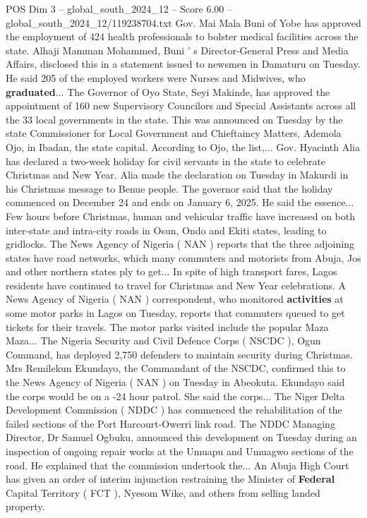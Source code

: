 \begin{textsample}{POS Dim 3 – global\_south\_2024\_12 – Score 6.00 – global\_south\_2024\_12/119238704.txt}
Gov.
Mai Mala Buni of Yobe has approved the employment of 424 health professionals to bolster medical facilities across the state.
Alhaji Mamman Mohammed, Buni ' s Director-General Press and Media Affairs, disclosed this in a statement issued to newsmen in Damaturu on Tuesday.
He said 205 of the employed workers were Nurses and Midwives, who \textbf{graduated}...
The Governor of Oyo State, Seyi Makinde, has approved the appointment of 160 new Supervisory Councilors and Special Assistants across all the 33 local governments in the state.
This was announced on Tuesday by the state Commissioner for Local Government and Chieftaincy Matters, Ademola Ojo, in Ibadan, the state capital.
According to Ojo, the list,...
Gov.
Hyacinth Alia has declared a two-week holiday for civil servants in the state to celebrate Christmas and New Year.
Alia made the declaration on Tuesday in Makurdi in his Christmas message to Benue people.
The governor said that the holiday commenced on December 24 and ends on January 6, 2025.
He said the essence...
Few hours before Christmas, human and vehicular traffic have increased on both inter-state and intra-city roads in Osun, Ondo and Ekiti states, leading to gridlocks.
The News Agency of Nigeria ( NAN ) reports that the three adjoining states have road networks, which many commuters and motorists from Abuja, Jos and other northern states ply to get...
In spite of high transport fares, Lagos residents have continued to travel for Christmas and New Year celebrations.
A News Agency of Nigeria ( NAN ) correspondent, who monitored \textbf{activities} at some motor parks in Lagos on Tuesday, reports that commuters queued to get tickets for their travels.
The motor parks visited include the popular Maza Maza...
The Nigeria Security and Civil Defence Corps ( NSCDC ), Ogun Command, has deployed 2,750 defenders to maintain security during Christmas.
Mrs Remilekun Ekundayo, the Commandant of the NSCDC, confirmed this to the News Agency of Nigeria ( NAN ) on Tuesday in Abeokuta.
Ekundayo said the corps would be on a -24 hour patrol.
She said the corps...
The Niger Delta Development Commission ( NDDC ) has commenced the rehabilitation of the failed sections of the Port Harcourt-Owerri link road.
The NDDC Managing Director, Dr Samuel Ogbuku, announced this development on Tuesday during an inspection of ongoing repair works at the Umuapu and Umuagwo sections of the road.
He explained that the commission undertook the...
An Abuja High Court has given an order of interim injunction restraining the Minister of \textbf{Federal} Capital Territory ( FCT ), Nyesom Wike, and others from selling landed property.

\end{textsample}

